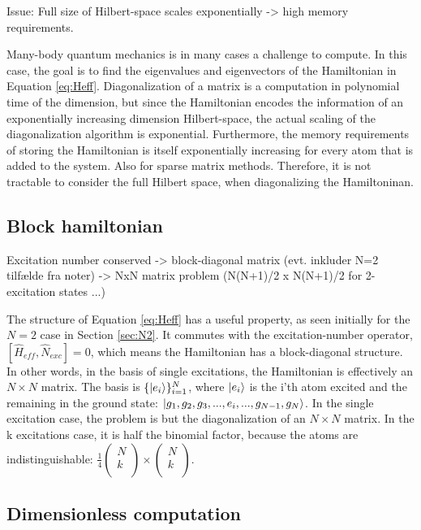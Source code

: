 \documentclass{article}
\begin{document}
Issue: Full size of Hilbert-space scales exponentially -> high memory requirements.

Many-body quantum mechanics is in many cases a challenge to compute. In this case, the goal is to find the eigenvalues and eigenvectors of the Hamiltonian in Equation \ref{eq:Heff}. Diagonalization of a matrix is a computation in polynomial time of the dimension, but since the Hamiltonian encodes the information of an exponentially increasing dimension Hilbert-space, the actual scaling of the diagonalization algorithm is exponential. Furthermore, the memory requirements of storing the Hamiltonian is itself exponentially increasing for every atom that is added to the system. Also for sparse matrix methods. Therefore, it is not tractable to consider the full Hilbert space, when diagonalizing the Hamiltoninan. 

\subsection{Block hamiltonian}\label{sec:block}

Excitation number conserved -> block-diagonal matrix (evt. inkluder N=2 tilfælde fra noter) -> NxN matrix problem (N(N+1)/2 x N(N+1)/2 for 2-excitation states ...)

The structure of Equation \ref{eq:Heff} has a useful property, as seen initially for the $N=2$ case in Section \ref{sec:N2}. It commutes with the excitation-number operator, $[\hat{H}_{eff}, \hat{N}_{exc}] = 0$, which means the Hamiltonian has a block-diagonal structure. In other words, in the basis of single excitations, the Hamiltonian is effectively an $N \times N$ matrix. The basis is $\{ \ket{e_i} \}_{i=1}^N$, where $\ket{e_i}$ is the i'th atom excited and the remaining in the ground state: $\ket{g_1, g_2, g_3, ..., e_i, ..., g_{N-1}, g_N}$. In the single excitation case, the problem is but the diagonalization of an $N \times N$ matrix. In the k excitations case, it is half the binomial factor, because the atoms are indistinguishable: $\frac{1}{4} \begin{pmatrix} N \\ k \\ \end{pmatrix} \times \begin{pmatrix} N \\ k \\ \end{pmatrix}$.

\subsection{Dimensionless computation}\label{sec:dimless}
\end{document}
